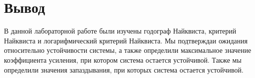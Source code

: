 \chapter{Вывод}
В данной лабораторной работе были изучены годограф Найквиста, критерий Найквиста и логарифмический
критерий Найквиста. Мы подтверждаи ожидания относительно устойчивости системы, а также определили
максимальное значение коэффициента усиления, при котором система остается устойчивой. Также мы
определили значения запаздывания, при которых система остается устойчивой.
 
\endinput